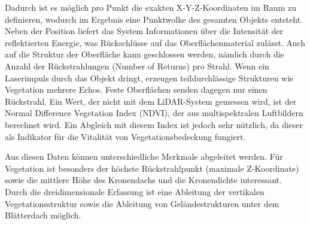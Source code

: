 Dadurch ist es möglich pro Punkt die exakten X-Y-Z-Koordinaten im Raum zu definieren, wodurch im Ergebnis eine Punktwolke des gesamten Objekts entsteht. Neben der Position liefert das System Informationen über die Intensität der reflektierten Energie, was Rückschlüsse auf das Oberflächenmaterial zulässt. Auch auf die Struktur der Oberfläche kann geschlossen werden, nämlich durch die Anzahl der Rückstrahlungen (Number of Returns) pro Strahl. Wenn ein Laserimpuls durch das Objekt dringt, erzeugen teildurchlässige Strukturen wie Vegetation mehrere Echos. Feste Oberflächen senden dagegen nur einen Rückstrahl.
Ein Wert, der nicht mit dem LiDAR-System gemessen wird, ist der Normal Difference Vegetation Index (NDVI), der aus multispektralen Luftbildern berechnet wird. Ein Abgleich mit diesem Index ist jedoch sehr nützlich, da dieser als Indikator für die Vitalität von Vegetationsbedeckung fungiert.

Aus diesen Daten können unterschiedliche Merkmale abgeleitet werden. Für Vegetation ist besonders der höchste Rückstrahlpunkt (maximale Z-Koordinate) sowie die mittlere Höhe des Kronendachs und die Kronendichte interessant. Durch die dreidimensionale Erfassung ist eine Ableitung der vertikalen Vegetationsstruktur sowie die Ableitung von Geländestrukturen unter dem Blätterdach möglich.

  